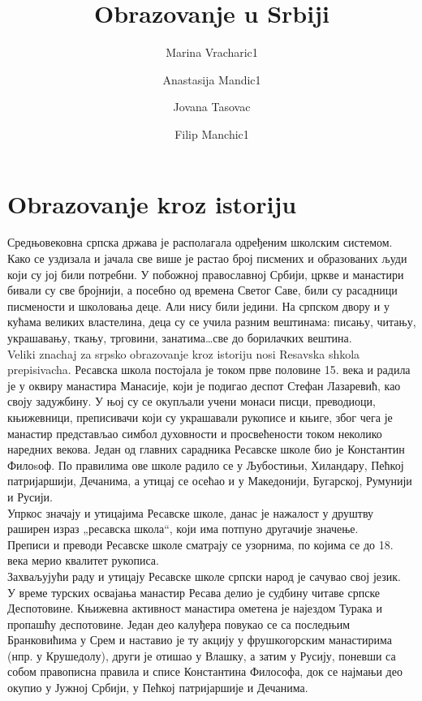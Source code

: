 \documentclass[12pt,twoside]{article}
\title{Obrazovanje u Srbiji}
\author{Marina Vracharic1\and Anastasija Mandic1\and Jovana Tasovac\and Filip Manchic1}
\newcommand{\cirilica}[1]{{\fontencoding{OT2}{\selectfont{#1}}}}
\begin{document}
\maketitle
    \renewcommand\contentsname{Sadrzhaj}
    \tableofcontents{}
    \thispagestyle{empty}
    \clearpage
    \thispagestyle{empty}
     \cleardoublepage
    
    \renewcommand\bibname{\cirilica{Literatura}}
    \nocite{*}
    
    
  \section{Obrazovanje kroz istoriju}
  Средњовековна српска држава је располагала одређеним школским системом. Како се уздизала и јачала све више је растао број писмених и образованих људи који су јој били потребни. У побожној православној Србији, цркве и манастири бивали су све бројнији, а посебно од времена Светог Саве, били су расадници писмености и школовања деце. Али нису били једини. На српском двору и у кућама великих властелина, деца су се учила разним вештинама: писању, читању, украшавању, ткању, трговини, занатима…све до борилачких вештина.
  \\Veliki znachaj za srpsko obrazovanje kroz istoriju nosi Resavska shkola prepisivacha. Ресавска школа постојала је током прве половине 15. века и радила је у оквиру манастира Манасије, који је подигао деспот Стефан Лазаревић, као своју задужбину. У њој су се окупљали учени монаси писци, преводиоци, књижевници, преписивачи који су украшавали рукописе и књиге, због чега је манастир представљао симбол духовности и просвећености током неколико наредних векова. Један од главних сарадника Ресавске школе био је Константин Филоsоф. По правилима ове школе радило се у Љубостињи, Хиландару, Пећкој патријаршији, Дечанима, а утицај се осећао и у Македонији, Бугарској, Румунији и Русији. \\Упркос значају и утицајима Ресавске школе, данас је нажалост у друштву раширен израз „ресавска школа“, који има потпуно другачије значење.\\ Преписи и преводи Ресавске школе сматрају се узорнима, по којима се до 18. века мерио квалитет рукописа.\\ Захваљујући раду и утицају Ресавске школе српски народ је сачувао свој језик. \\ У време турских освајања манастир Ресава делио је судбину читаве српске Деспотовине. Књижевна активност манастира ометена је најездом Турака и пропашћу деспотовине. Један део калуђера повукао се са последњим Бранковићима у Срем и наставио је ту акцију у фрушкогорским манастирима (нпр. у Крушедолу), други је отишао у Влашку, а затим у Русију, поневши са собом правописна правила и списе Константина Философа, док се најмањи део окупио у Јужној Србији, у Пећкој патријаршије и Дечанима.\\
\end{document}
